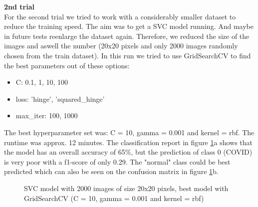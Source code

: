 \documentclass{article}
\begin{document}
\textbf{2nd trial}\\
For the second trial we tried to work with a considerably smaller dataset to reduce the training speed. The aim was to get a SVC model running. And maybe in future 
tests reenlarge the dataset again. Therefore, we reduced the size of the images and aswell the number (20x20 pixels and only 2000 images randomly chosen from the train 
dataset). In this run we tried to use GridSearchCV to find the best parameters out of these options: 
\begin{itemize}
    \item C: 0.1, 1, 10, 100
    \item loss: 'hinge', 'squared\_hinge'
    \item max\_iter: 100, 1000
\end{itemize}

The best hyperparameter set was: C = 10,  gamma = 0.001 and kernel = rbf. The runtime was approx. 12 minutes. The classification report in figure 
\ref{fig:SVC_2000_20x20_grid}a shows that the model has an overall accuracy of 65\%, but the prediction of class 0 (COVID) is very poor with a f1-score of only 0.29. The "normal" class could be best 
predicted which can also be seen on the confusion matrix in figure \ref{fig:SVC_2000_20x20_grid}b.

\begin{figure}%
  \centering
  \qquad
  \caption{SVC model with 2000 images of size 20x20 pixels, best model with GridSearchCV (C = 10,  gamma = 0.001 and kernel = rbf)}
  \label{fig:SVC_2000_20x20_grid}
\end{figure}
\end{document}
